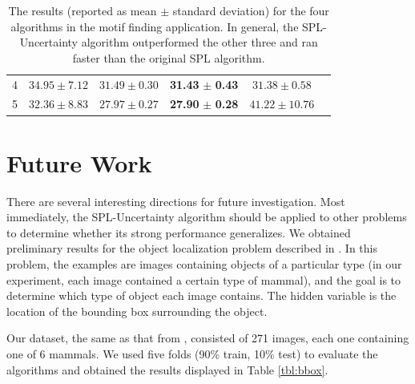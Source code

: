 \documentclass{article}
\begin{document}
\begin{table}
\begin{center}
{\begin{tabular}{|c|c|c|c|c|c|}
4 & $34.95 \pm 7.12$ & $31.49 \pm 0.30$ & \textbf{31.43} $\pm$ \textbf{0.43} & $31.38 \pm 0.58$\\
5 & $32.36 \pm 8.83$ & $27.97 \pm 0.27$ & \textbf{27.90} $\pm$ \textbf{0.28} & $41.22 \pm 10.76$\\\hline
\end{tabular}
}
\end{center}
\caption{The results (reported as mean $\pm$ standard deviation) for the four algorithms in the motif finding application. In general, the SPL-Uncertainty algorithm outperformed the other three and ran faster than the original SPL algorithm. }
\label{tbl:motif}
\end{table}


\section{Future Work}

There are several interesting directions for future investigation. Most immediately, the SPL-Uncertainty algorithm should be applied to other problems to determine whether its strong performance generalizes. We obtained preliminary results for the object localization problem described in \cite{SPL}. In this problem, the examples are images containing objects of a particular type (in our experiment, each image contained a certain type of mammal), and the goal is to determine which type of object each image contains. The hidden variable is the location of the bounding box surrounding the object. 

Our dataset, the same as that from \cite{SPL}, consisted of 271 images, each one containing one of 6 mammals. We used five folds (90\% train, 10\% test) to evaluate the algorithms and obtained the results displayed in Table \ref{tbl:bbox}.  
\end{document}

